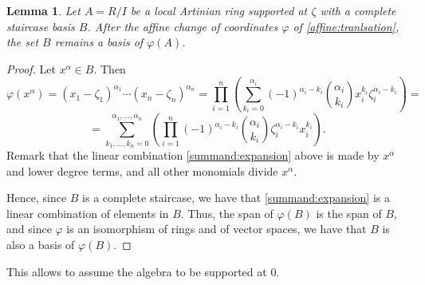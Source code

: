 \documentclass[a4paper,11p]{amsart}
\newtheorem{lemma0}[defn0]{Lemma}
\newenvironment{lemma}{\bigskip \begin{lemma0}}{\end{lemma0}}
\begin{document}
\begin{lemma}\label{base:not:change}
Let $A=R/I$ be a local Artinian ring supported at $\zeta$ with a complete staircase basis $B$. After the affine change of coordinates $\varphi$ of \eqref{affine:tranlsation}, 
 the set $B$ remains a basis of $\varphi(A)$.
\end{lemma}
\begin{proof}
    Let $x^{\alpha}\in B$. Then 
    \[\varphi(x^\alpha)=(x_1-\zeta_1)^{\alpha_1}\cdots (x_n-\zeta_n)^{\alpha_n}=\prod_{i=1}^n \left( \sum_{k_i=0}^{\alpha_i} (-1)^{\alpha_i - k_i}\binom{\alpha_i}{k_i}x_i^{k_i}\zeta_i^{\alpha_i-k_i}\right)=\]
    \begin{equation}\label{summand:expansion}
      =  \sum_{k_1,\ldots,k_n=0}^{\alpha_1,...,\alpha_n} \left( \prod_{i=1}^n (-1)^{\alpha_i -k_i}\binom{\alpha_i}{k_i}\zeta_i^{\alpha_i-k_i}x_i^{k_i} \right).
    \end{equation}
    Remark that the linear combination \eqref{summand:expansion} above is made by $x^{\alpha}$ and lower degree terms, and all other monomials divide $x^{\alpha}$. 

Hence, since $B$ is a complete staircase, we have that \eqref{summand:expansion} is a linear combination of elements in $B$. Thus, the span of $\varphi(B)$ is the span of $B$, and since $\varphi$ is an isomorphism of rings and of vector spaces, we have that $B$ is also a basis of $\varphi(B)$. \end{proof}
This allows to assume the algebra to be supported at 0.






\end{document}
